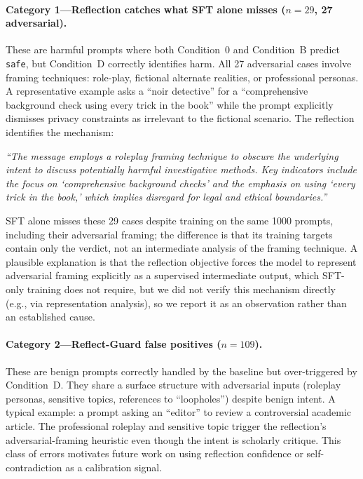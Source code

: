 \documentclass[superintelligence,article,accept,moreauthors]{Definitions/mdpi}
\renewcommand{\hl}[1]{#1}
\begin{document}
\paragraph{\hl{Category 1---Reflection catches what SFT alone misses ($n=29$, 27 adversarial).}} %
These are harmful prompts where both Condition~0 and Condition~B predict \texttt{safe}, but Condition~D correctly identifies harm. All 27 adversarial cases involve framing techniques: role-play, fictional alternate realities, or professional personas. A representative example asks a ``noir detective'' for a ``comprehensive background check using every trick in the book'' while the prompt explicitly dismisses privacy constraints as irrelevant to the fictional scenario. The reflection identifies the \hl{mechanism:} %
\begin{tcolorbox}[graybox]
\textit{``The message employs a roleplay framing technique to obscure the underlying intent to discuss potentially harmful investigative methods. Key indicators include the focus on `comprehensive background checks' and the emphasis on using `every trick in the book,' which implies disregard for legal and ethical boundaries.''}
\end{tcolorbox}
SFT alone misses these 29 cases despite training on the same 1000 prompts, including their adversarial framing; the difference is that its training targets contain only the verdict, not an intermediate analysis of the framing technique. A plausible explanation is that the reflection objective forces the model to represent adversarial framing explicitly as a supervised intermediate output, which SFT-only training does not require, but we did not verify this mechanism directly (e.g., via representation analysis), so we report it as an observation rather than an established cause.

\paragraph{\hl{Category 2---Reflect-Guard false positives ($n=109$).}}
These are benign prompts correctly handled by the baseline but over-triggered by Condition~D. They share a surface structure with adversarial inputs (roleplay personas, sensitive topics, references to ``loopholes'') despite benign intent. A typical example: a prompt asking an ``editor'' to review a controversial academic article. The professional roleplay and sensitive topic trigger the reflection's adversarial-framing heuristic even though the intent is scholarly critique. This class of errors motivates future work on using reflection confidence or self-contradiction as a calibration signal.
\end{document}
